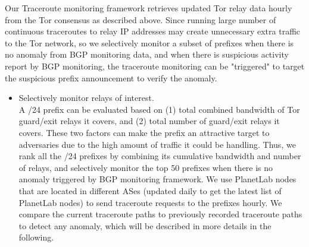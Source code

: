 Our Traceroute monitoring framework retrieves updated Tor relay data hourly from the Tor consensus as described above. Since running large number of continuous traceroutes to relay IP addresses may create unnecessary extra traffic to the Tor network, so we selectively monitor a subset of prefixes when there is no anomaly from BGP monitoring data, and when there is suspicious activity report by BGP monitoring, the traceroute monitoring can be "triggered" to target the suspicious prefix announcement to verify the anomaly. 
\begin{itemize}
\item Selectively monitor relays of interest.\\
A /24 prefix can be evaluated based on (1) total combined bandwidth of Tor guard/exit relays it covers, and (2) total number of guard/exit relays it covers. These two factors can make the prefix an attractive target to adversaries due to the high amount of traffic it could be handling. Thus, we rank all the /24 prefixes by combining its cumulative bandwidth and number of relays, and selectively monitor the top 50 prefixes when there is no anomaly triggered by BGP monitoring framework. 
We use PlanetLab nodes that are located in different ASes (updated daily to get the latest list of PlanetLab nodes) to send traceroute requests to the prefixes hourly. We compare the current traceroute paths to previously recorded traceroute paths to detect any anomaly, which will be described in more details in the following. 


\end{itemize}
